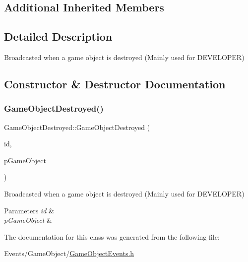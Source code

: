 \subsection*{Additional Inherited Members}


\subsection{Detailed Description}
Broadcasted when a game object is destroyed (Mainly used for D\+E\+V\+E\+L\+O\+P\+ER) 

\subsection{Constructor \& Destructor Documentation}
\mbox{\label{classGameObjectDestroyed_a0439ed5e9851a520720b6c1f2dbe5858}} 
\subsubsection{\texorpdfstring{Game\+Object\+Destroyed()}{GameObjectDestroyed()}}
{\footnotesize\ttfamily Game\+Object\+Destroyed\+::\+Game\+Object\+Destroyed (\begin{DoxyParamCaption}\item[{size\+\_\+t}]{id,  }\item[{\hyperlink{classGameObject}{Game\+Object} $\ast$}]{p\+Game\+Object }\end{DoxyParamCaption})\hspace{0.3cm}{\ttfamily [inline]}}



Broadcasted when a game object is destroyed (Mainly used for D\+E\+V\+E\+L\+O\+P\+ER) 


\begin{DoxyParams}{Parameters}
{\em id} & \\
\hline
{\em p\+Game\+Object} & \\
\hline
\end{DoxyParams}


The documentation for this class was generated from the following file\+:\begin{DoxyCompactItemize}
\item 
Events/\+Game\+Object/\hyperlink{GameObjectEvents_8h}{Game\+Object\+Events.\+h}\end{DoxyCompactItemize}
